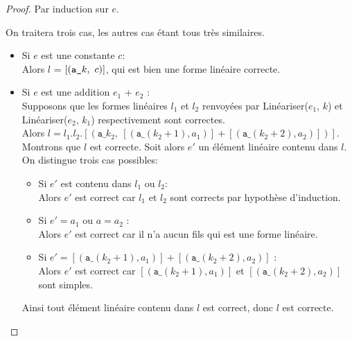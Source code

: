 \begin{proof}
    Par induction sur $e$.

    On traitera trois cas, les autres cas étant tous très similaires.

    \begin{itemize}
        \item Si $e$ est une constante $c$: \\
              Alors $l$ = $[(\textnormal{\texttt{a\_}}k,\ c)]$, qui est bien
              une forme linéaire correcte.
              \bigskip

        \item Si $e$ est une addition $e_1$ + $e_2$ : \\
              Supposons que les formes linéaires $l_1$ et $l_2$ renvoyées par
              Linéariser($e_1$, $k$) et Linéariser($e_2$, $k_1$) respectivement
              sont correctes. \\
              Alors $l = l_1.l_2.[(\texttt{a\_}k_2,\ [(\texttt{a\_}(k_2 + 1), a_1)] + [(\texttt{a\_}(k_2 + 2), a_2)])]$.
              Montrons que $l$ est correcte. Soit alors $e'$ un élément linéaire
              contenu dans $l$. On distingue trois cas possibles:
              \begin{itemize}
                  \item Si $e'$ est contenu dans $l_1$ ou $l_2$: \\
                        Alors $e'$ est correct car $l_1$ et $l_2$ sont corrects
                        par hypothèse d'induction.
                  \item Si $e' = a_1$ ou $a = a_2$ : \\
                        Alors $e'$ est correct car il n'a aucun fils qui est une
                        forme linéaire.
                  \item Si $e' = [(\texttt{a\_}(k_2 + 1), a_1)] + [(\texttt{a\_}(k_2 + 2), a_2)]$ : \\
                        Alors $e'$ est correct car $[(\texttt{a\_}(k_2 + 1), a_1)]$ et $[(\texttt{a\_}(k_2 + 2), a_2)]$
                        sont simples.
              \end{itemize}
              Ainsi tout élément linéaire contenu dans $l$ est correct, donc $l$
              est correcte.
              \bigskip


\end{itemize}
\end{proof}
